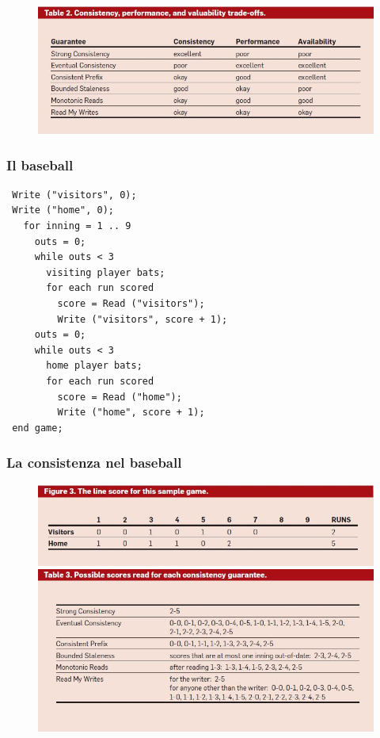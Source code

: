 \begin{frame}
\frametitle{}
	\begin{figure}
		\includegraphics[scale=0.5]{baseball/tab2.jpg}
	\end{figure}
\end{frame}

\begin{frame}[fragile]
\frametitle{Il baseball}
\begin{verbatim}
 Write ("visitors", 0);
 Write ("home", 0);
   for inning = 1 .. 9
     outs = 0;
     while outs < 3
       visiting player bats;
       for each run scored
         score = Read ("visitors");
         Write ("visitors", score + 1);
     outs = 0;
     while outs < 3
       home player bats;
       for each run scored
         score = Read ("home");
         Write ("home", score + 1);
 end game;
\end{verbatim}
\end{frame}

\begin{frame}
\frametitle{La consistenza nel baseball}
	\begin{figure}
		\includegraphics[scale=0.4]{baseball/tab3a.jpg}\\
		\includegraphics[scale=0.4]{baseball/tab3.jpg}
	\end{figure}
\end{frame}
